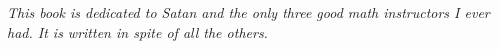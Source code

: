 \null\vfill

\begingroup\centering

{\large \itshape
This book is dedicated to Satan and the only three good math instructors I ever had. It is written in spite of all the others.
}

\endgroup

\vfill

\cleardoublepage